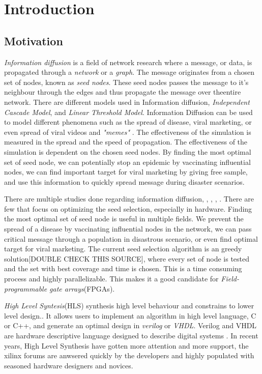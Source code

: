\chapter{Introduction} \label{intro}

\section{Motivation}
\textit{Information diffusion} is a field of network research where a message, or data, is propagated through a \textit{network} or a \textit{graph}. The message originates from a chosen set of nodes, known as \textit{seed nodes}. These seed nodes passes the message to it's neighbour through the edges and thus propagate the message over theentire network. There are different models used in Information diffusion, \textit{Independent Cascade Model}, and \textit{Linear Threshold Model}. Information Diffusion can be used to model different phenomena such as the spread of disease, viral marketing, or even spread of viral videos and \textit{"memes"}\cite{InformationDiffusionThroughBlogspace} \cite{Romero:2011:DMI:1963405.1963503}. The effectiveness of the simulation is measured in the spread and the speed of propagation. The effectiveness of the simulation is dependent on the chosen seed nodes. By finding the most optimal set of seed node, we can potentially stop an epidemic by vaccinating influential nodes, we can find important target for viral marketing by giving free sample, and use this information to quickly spread message during disaster scenarios.

There are multiple studies done regarding information diffusion, \cite{cha2010measuring}, \cite{InformationDiffusionThroughBlogspace}, \cite{5694014},  \cite{InfoDiffAndExternalInfluInNetworks}. There are  few that focus on optimizing the seed selection, especially in hardware. Finding the most optimal set of seed node is useful in multiple fields. We prevent the spread of a disease by vaccinating influential nodes in the network, we can pass critical message through a population in disastrous scenario, or even find optimal target for viral marketing.  The current seed selection algorithm is an greedy solution\cite{greedyInfluenc2005}[DOUBLE CHECK THIS SOURCE], where every set of node is tested and the set with best coverage and time is chosen. This is a time consuming process and highly parallelizable. This makes it a good candidate for \textit{Field-programmable gate arrays}(FPGAs). 

\textit{High Level Syntesis}(HLS) synthesis high level behaviour and constrains to lower level design.\cite{52214}. It allows users to implement an algorithm in high level language, C or C++, and generate an optimal design in \textit{verilog} or \textit{VHDL}. Verilog and VHDL are hardware descriptive language designed to describe digital systems \cite{thomas2008verilog}. In recent years, High Level Synthesis have gotten more attention and more support, the xilinx forums are anwsered quickly by the developers and highly populated with seasoned hardware designers and novices. 

